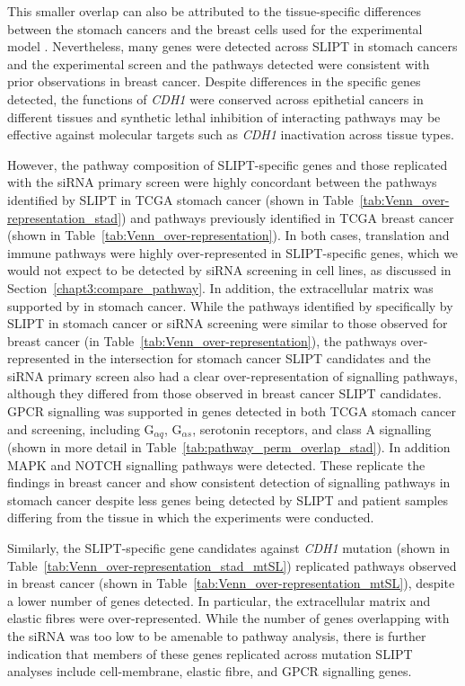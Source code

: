 This smaller overlap can also be attributed to the tissue-specific differences between the stomach cancers and the breast cells used for the experimental model \citep{Chen2014}. Nevertheless, many genes were detected across \gls{SLIPT} in stomach cancers and the experimental screen \citep{Telford2015} and the pathways detected were consistent with prior observations in breast cancer. Despite differences in the specific genes detected, the functions of \textit{CDH1} were conserved across epithetial cancers in different tissues and synthetic lethal inhibition of interacting pathways may be effective against molecular targets such as \textit{CDH1} inactivation across tissue types.

However, the pathway composition of \gls{SLIPT}-specific genes and those replicated with the siRNA primary screen \citep{Telford2015} were highly concordant between the pathways identified by \gls{SLIPT} in TCGA stomach cancer (shown in Table~\ref{tab:Venn_over-representation_stad}) and pathways previously identified in TCGA breast cancer (shown in Table~\ref{tab:Venn_over-representation}). In both cases, translation and immune pathways were highly over-represented in \gls{SLIPT}-specific genes, which we would not expect to be detected by siRNA screening in cell lines, as discussed in Section~\ref{chapt3:compare_pathway}. In addition, the extracellular matrix was supported by in stomach cancer. While the pathways identified by specifically by \gls{SLIPT} in stomach cancer or siRNA screening were similar to those observed for breast cancer (in Table~\ref{tab:Venn_over-representation}), the pathways over-represented in the intersection for stomach cancer \gls{SLIPT} candidates and the siRNA primary screen \citep{Telford2015} also had a clear over-representation of signalling pathways, although they differed from those observed in breast cancer \gls{SLIPT} candidates. GPCR signalling was supported in genes detected in both TCGA stomach cancer and screening, including G$_{\alpha q}$, G$_{\alpha s}$, serotonin receptors, and class A signalling (shown in more detail in Table~\ref{tab:pathway_perm_overlap_stad}). In addition MAPK and NOTCH signalling pathways were detected. These replicate the findings in breast cancer and show consistent detection of signalling pathways in stomach cancer despite less genes being detected by \gls{SLIPT} and patient samples differing from the tissue in which the experiments were conducted.

Similarly, the \gls{SLIPT}-specific gene candidates against \textit{CDH1} mutation (shown in Table~\ref{tab:Venn_over-representation_stad_mtSL}) replicated pathways observed in breast cancer (shown in Table~\ref{tab:Venn_over-representation_mtSL}), despite a lower number of genes detected. In particular, the extracellular matrix and elastic fibres were over-represented. While the number of genes overlapping with the siRNA was too low to be amenable to pathway analysis, there is further indication that members of these genes replicated across mutation \gls{SLIPT} analyses include cell-membrane, elastic fibre, and GPCR signalling genes. 

